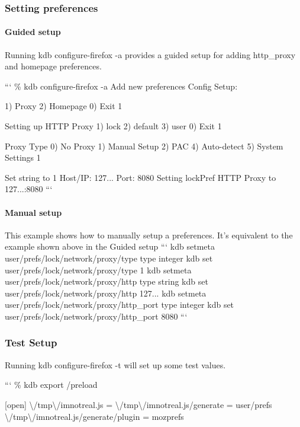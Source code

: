 \subsubsection*{Setting preferences}

\paragraph*{Guided setup}

Running {\ttfamily kdb configure-\/firefox -\/a} provides a guided setup for adding http\+\_\+proxy and homepage preferences.

``` \% kdb configure-\/firefox -\/a Add new preferences Config Setup\+:

1) Proxy 2) Homepage 0) Exit 1

Setting up H\+T\+T\+P Proxy 1) lock 2) default 3) user 0) Exit 1

Proxy Type 0) No Proxy 1) Manual Setup 2) P\+A\+C 4) Auto-\/detect 5) System Settings 1

Set string to 1 Host/\+I\+P\+: 127... Port\+: 8080 Setting lock\+Pref H\+T\+T\+P Proxy to 127...\+:8080 ```

\paragraph*{Manual setup}

This example shows how to manually setup a preferences. It's equivalent to the example shown above in the {\ttfamily Guided setup} ``` kdb setmeta user/prefs/lock/network/proxy/type type integer kdb set user/prefs/lock/network/proxy/type 1 kdb setmeta user/prefs/lock/network/proxy/http type string kdb set user/prefs/lock/network/proxy/http 127... kdb setmeta user/prefs/lock/network/proxy/http\+\_\+port type integer kdb set user/prefs/lock/network/proxy/http\+\_\+port 8080 ```

\subsubsection*{Test Setup}

Running {\ttfamily kdb configure-\/firefox -\/t} will set up some test values.

``` \% kdb export /preload

\mbox{[}open\mbox{]} \textbackslash{}/tmp\textbackslash{}/imnotreal.js = \textbackslash{}/tmp\textbackslash{}/imnotreal.js/generate = user/prefs \textbackslash{}/tmp\textbackslash{}/imnotreal.js/generate/plugin = mozprefs

